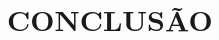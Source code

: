 \documentclass[12pt, brazil, ruledheader, pnumromarab,normaltoc]{abnt}
\begin{document}
\chapter{CONCLUSÃO}

%
%
%
\end{document}
